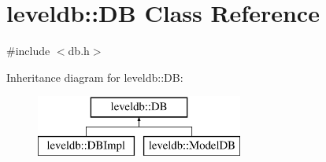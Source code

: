 \hypertarget{classleveldb_1_1_d_b}{}\section{leveldb\+:\+:D\+B Class Reference}
\label{classleveldb_1_1_d_b}


{\ttfamily \#include $<$db.\+h$>$}

Inheritance diagram for leveldb\+:\+:D\+B\+:\begin{figure}[H]
\begin{center}
\leavevmode
\includegraphics[height=2.000000cm]{classleveldb_1_1_d_b}
\end{center}
\end{figure}
